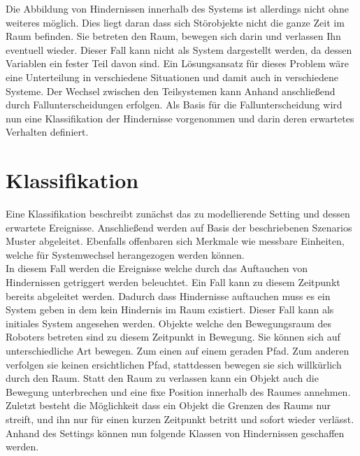 Die Abbildung von Hindernissen innerhalb des Systems ist allerdings nicht ohne weiteres möglich. Dies liegt daran dass sich Störobjekte nicht die ganze Zeit im Raum befinden. Sie betreten den Raum, bewegen sich darin und verlassen Ihn eventuell wieder. Dieser Fall kann nicht als System dargestellt werden, da dessen Variablen ein fester Teil davon sind. Ein Lösungsansatz für dieses Problem wäre eine Unterteilung in verschiedene Situationen und damit auch in verschiedene Systeme. Der Wechsel zwischen den Teilsystemen kann Anhand anschließend durch Fallunterscheidungen erfolgen. Als Basis für die Fallunterscheidung wird nun eine Klassifikation der Hindernisse vorgenommen und darin deren erwartetes Verhalten definiert.

\section{Klassifikation}
Eine Klassifikation beschreibt zunächst das zu modellierende Setting und dessen erwartete Ereignisse. Anschließend werden auf Basis der beschriebenen Szenarios Muster abgeleitet. Ebenfalls offenbaren sich Merkmale wie messbare Einheiten, welche für Systemwechsel herangezogen werden können.\\
In diesem Fall werden die Ereignisse welche durch das Auftauchen von Hindernissen getriggert werden beleuchtet. Ein Fall kann zu diesem Zeitpunkt bereits abgeleitet werden. Dadurch dass Hindernisse auftauchen muss es ein System geben in dem kein Hindernis im Raum existiert. Dieser Fall kann als initiales System angesehen werden. Objekte welche den Bewegungsraum des Roboters betreten sind zu diesem Zeitpunkt in Bewegung. Sie können sich auf unterschiedliche Art bewegen. Zum einen auf einem geraden Pfad. Zum anderen verfolgen sie keinen ersichtlichen Pfad, stattdessen bewegen sie sich willkürlich durch den Raum. Statt den Raum zu verlassen kann ein Objekt auch die Bewegung unterbrechen und eine fixe Position innerhalb des Raumes annehmen. Zuletzt besteht die Möglichkeit dass ein Objekt die Grenzen des Raums nur streift, und ihn nur für einen kurzen Zeitpunkt betritt und sofort wieder verlässt.\\
Anhand des Settings können nun folgende Klassen von Hindernissen geschaffen werden.


